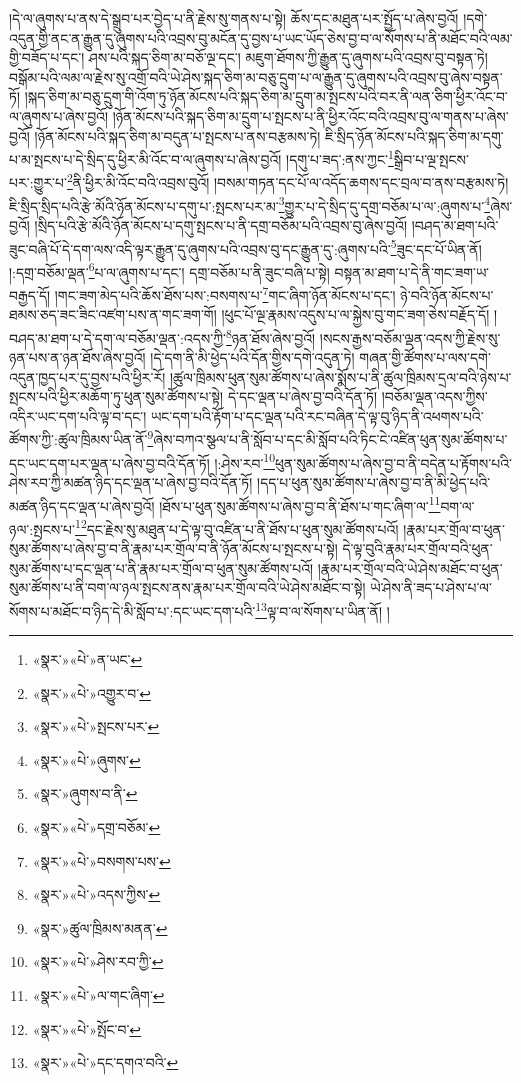 །དེ་ལ་ཞུགས་པ་ནས་དེ་སྒྲུབ་པར་བྱེད་པ་ནི་རྗེས་སུ་གནས་པ་སྟེ། ཆོས་དང་མཐུན་པར་སྤྱོད་པ་ཞེས་བྱའོ། །དགེ་འདུན་གྱི་ནང་ན་རྒྱུན་དུ་ཞུགས་པའི་འབྲས་བུ་མངོན་དུ་བྱས་པ་ཡང་ཡོད་ཅེས་བྱ་བ་ལ་སོགས་པ་ནི་མཐོང་བའི་ལམ་གྱི་བཟོད་པ་དང་། ཤས་པའི་སྐད་ཅིག་མ་བཅོ་ལྔ་དང་། མཇུག་ཐོགས་ཀྱི་རྒྱུན་དུ་ཞུགས་པའི་འབྲས་བུ་བསྟན་ཏེ། བསྒོམ་པའི་ལམ་ལ་རྗེས་སུ་འགྲོ་བའི་ཡེ་ཤེས་སྐད་ཅིག་མ་བཅུ་དྲུག་པ་ལ་རྒྱུན་དུ་ཞུགས་པའི་འབྲས་བུ་ཞེས་བསྟན་ཏོ། །སྐད་ཅིག་མ་བཅུ་དྲུག་གི་འོག་ཏུ་ཉོན་མོངས་པའི་སྐད་ཅིག་མ་དྲུག་མ་སྤངས་པའི་བར་ནི་ལན་ཅིག་ཕྱིར་འོང་བ་ལ་ཞུགས་པ་ཞེས་བྱའོ། །ཉོན་མོངས་པའི་སྐད་ཅིག་མ་དྲུག་པ་སྤངས་པ་ནི་ཕྱིར་འོང་བའི་འབྲས་བུ་ལ་གནས་པ་ཞེས་བྱའོ། །ཉོན་མོངས་པའི་སྐད་ཅིག་མ་བདུན་པ་སྤངས་པ་ནས་བརྩམས་ཏེ། ཇི་སྲིད་ཉོན་མོངས་པའི་སྐད་ཅིག་མ་དགུ་པ་མ་སྤངས་པ་དེ་སྲིད་དུ་ཕྱིར་མི་འོང་བ་ལ་ཞུགས་པ་ཞེས་བྱའོ། །དགུ་པ་ཟད་:ནས་ཀྱང་\footnote{«སྣར་»«པེ་»ན་ཡང་}སྒྲིབ་པ་ལྔ་སྤངས་པར་:གྱུར་པ་\footnote{«སྣར་»«པེ་»འགྱུར་བ་}ནི་ཕྱིར་མི་འོང་བའི་འབྲས་བུའོ། །བསམ་གཏན་དང་པོ་ལ་འདོད་ཆགས་དང་བྲལ་བ་ནས་བརྩམས་ཏེ། ཇི་སྲིད་སྲིད་པའི་རྩེ་མོའི་ཉོན་མོངས་པ་དགུ་པ་:སྤངས་པར་མ་\footnote{«སྣར་»«པེ་»སྤངས་པར་}གྱུར་པ་དེ་སྲིད་དུ་དགྲ་བཅོམ་པ་ལ་:ཞུགས་པ་\footnote{«སྣར་»«པེ་»ཞུགས་}ཞེས་བྱའོ། །སྲིད་པའི་རྩེ་མོའི་ཉོན་མོངས་པ་དགུ་སྤངས་པ་ནི་དགྲ་བཅོམ་པའི་འབྲས་བུ་ཞེས་བྱའོ། །བཤད་མ་ཐག་པའི་ཟུང་བཞི་པོ་དེ་དག་ལས་འདི་ལྟར་རྒྱུན་དུ་ཞུགས་པའི་འབྲས་བུ་དང་རྒྱུན་དུ་:ཞུགས་པའི་\footnote{«སྣར་»ཞུགས་བ་ནི་}ཟུང་དང་པོ་ཡིན་ནོ། །:དགྲ་བཅོམ་ལྡན་\footnote{«སྣར་»«པེ་»དགྲ་བཅོམ་}པ་ལ་ཞུགས་པ་དང་། དགྲ་བཅོམ་པ་ནི་ཟུང་བཞི་པ་སྟེ། བསྟན་མ་ཐག་པ་དེ་ནི་གང་ཟག་ཡ་བརྒྱད་དོ། །གང་ཟག་མེད་པའི་ཆོས་ཐོས་པས་:བསགས་པ་\footnote{«སྣར་»«པེ་»བསགས་པས་}གང་ཞིག་ཉོན་མོངས་པ་དང་། ཉེ་བའི་ཉོན་མོངས་པ་ཐམས་ཅད་ཟང་ཟིང་འཛག་པས་ན་གང་ཟག་གོ། །ཕུང་པོ་ལྔ་རྣམས་འདུས་པ་ལ་སྐྱེས་བུ་གང་ཟག་ཅེས་བརྗོད་དོ། །བཤད་མ་ཐག་པ་དེ་དག་ལ་བཅོམ་ལྡན་:འདས་ཀྱི་\footnote{«སྣར་»«པེ་»འདས་ཀྱིས་}ཉན་ཐོས་ཞེས་བྱའོ། །སངས་རྒྱས་བཅོམ་ལྡན་འདས་ཀྱི་རྗེས་སུ་ཉན་པས་ན་ཉན་ཐོས་ཞེས་བྱའོ། །དེ་དག་ནི་མི་ཕྱེད་པའི་དོན་གྱིས་དགེ་འདུན་ཏེ། གཞན་གྱི་ཚོགས་པ་ལས་དགེ་འདུན་ཁྱད་པར་དུ་བྱས་པའི་ཕྱིར་རོ། །ཚུལ་ཁྲིམས་ཕུན་སུམ་ཚོགས་པ་ཞེས་སྨོས་པ་ནི་ཚུལ་ཁྲིམས་དྲལ་བའི་ཉེས་པ་སྤངས་པའི་ཕྱིར་མཆོག་ཏུ་ཕུན་སུམ་ཚོགས་པ་སྟེ། དེ་དང་ལྡན་པ་ཞེས་བྱ་བའི་དོན་ཏོ། །བཅོམ་ལྡན་འདས་ཀྱིས་འདིར་ཡང་དག་པའི་ལྟ་བ་དང་། ཡང་དག་པའི་རྟོག་པ་དང་ལྡན་པའི་རང་བཞིན་དེ་ལྟ་བུ་ཉིད་ནི་འཕགས་པའི་ཚོགས་ཀྱི་:ཚུལ་ཁྲིམས་ཡིན་ནོ་\footnote{«སྣར་»ཚུལ་ཁྲིམས་མནན་}ཞེས་བཀའ་སྩལ་པ་ནི་སློབ་པ་དང་མི་སློབ་པའི་ཏིང་ངེ་འཛིན་ཕུན་སུམ་ཚོགས་པ་དང་ཡང་དག་པར་ལྡན་པ་ཞེས་བྱ་བའི་དོན་ཏོ། །:ཤེས་རབ་\footnote{«སྣར་»«པེ་»ཤེས་རབ་ཀྱི་}ཕུན་སུམ་ཚོགས་པ་ཞེས་བྱ་བ་ནི་བདེན་པ་རྟོགས་པའི་ཤེས་རབ་ཀྱི་མཚན་ཉིད་དང་ལྡན་པ་ཞེས་བྱ་བའི་དོན་ཏོ། །དད་པ་ཕུན་སུམ་ཚོགས་པ་ཞེས་བྱ་བ་ནི་མི་ཕྱེད་པའི་མཚན་ཉིད་དང་ལྡན་པ་ཞེས་བྱའོ། །ཐོས་པ་ཕུན་སུམ་ཚོགས་པ་ཞེས་བྱ་བ་ནི་ཐོས་པ་གང་ཞིག་ལ་\footnote{«སྣར་»«པེ་»ལ་གང་ཞིག་}བག་ལ་ཉལ་:སྤངས་པ་\footnote{«སྣར་»«པེ་»སྤོང་བ་}དང་རྗེས་སུ་མཐུན་པ་དེ་ལྟ་བུ་འཛིན་པ་ནི་ཐོས་པ་ཕུན་སུམ་ཚོགས་པའོ། །རྣམ་པར་གྲོལ་བ་ཕུན་སུམ་ཚོགས་པ་ཞེས་བྱ་བ་ནི་རྣམ་པར་གྲོལ་བ་ནི་ཉོན་མོངས་པ་སྤངས་པ་སྟེ། དེ་ལྟ་བུའི་རྣམ་པར་གྲོལ་བའི་ཕུན་སུམ་ཚོགས་པ་དང་ལྡན་པ་ནི་རྣམ་པར་གྲོལ་བ་ཕུན་སུམ་ཚོགས་པའོ། །རྣམ་པར་གྲོལ་བའི་ཡེ་ཤེས་མཐོང་བ་ཕུན་སུམ་ཚོགས་པ་ནི་བག་ལ་ཉལ་སྤངས་ནས་རྣམ་པར་གྲོལ་བའི་ཡེ་ཤེས་མཐོང་བ་སྟེ། ཡེ་ཤེས་ནི་ཟད་པ་ཤེས་པ་ལ་སོགས་པ་མཐོང་བ་ཉིད་དེ་མི་སློབ་པ་:དང་ཡང་དག་པའི་\footnote{«སྣར་»«པེ་»དང་དགའ་བའི་}ལྟ་བ་ལ་སོགས་པ་ཡིན་ནོ། །
